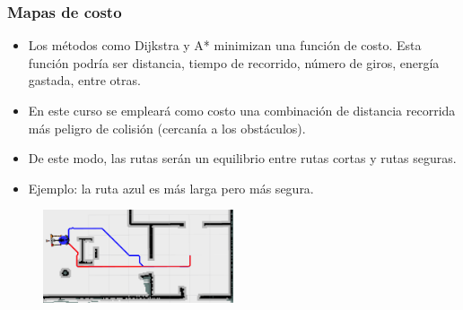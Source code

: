 \begin{frame}\frametitle{Mapas de costo}
  \begin{itemize}
  \item Los métodos como Dijkstra y A* minimizan una función de costo. Esta función podría ser distancia, tiempo de recorrido, número de giros, energía gastada, entre otras.
  \item En este curso se empleará como costo una combinación de distancia recorrida más peligro de colisión (cercanía a los obstáculos).
  \item De este modo, las rutas serán un equilibrio entre rutas cortas y rutas seguras.
  \item Ejemplo: la ruta azul es más larga pero más segura. 
  \end{itemize}
  \begin{figure}
    \centering
    \includegraphics[width=0.5\textwidth]{Figures/MotionPlanning/AStarComparison.png}
  \end{figure}
\end{frame}

